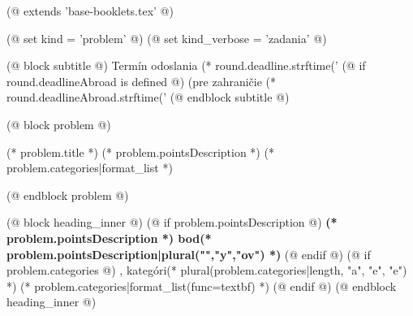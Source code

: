(@ extends 'base-booklets.tex' @)

(@ set kind = 'problem' @)
(@ set kind_verbose = 'zadania' @)

(@ block subtitle @)
    {
        \centering
        \vspace*{-5mm}
        Termín odoslania (* round.deadline.strftime('%
        (@ if round.deadlineAbroad is defined @) (pre zahraničie (* round.deadlineAbroad.strftime('%
    }
(@ endblock subtitle @)

(@ block problem @)
    \begin{seminar-problem}{(* problem.title *)}%
        {(* problem.pointsDescription *)}%
        {(* problem.categories|format_list *)}
    \end{seminar-problem}
(@ endblock problem @)

(@ block heading_inner @)
    (@ if problem.pointsDescription @)%
        \textbf{(* problem.pointsDescription *) bod(* problem.pointsDescription|plural("","y","ov") *)}%
    (@ endif @)%
    (@ if problem.categories @)%
        , kategóri(* plural(problem.categories|length, "a", "e", "e") *) (* problem.categories|format_list(func=textbf) *)%
    (@ endif @)%
(@ endblock heading_inner @)
